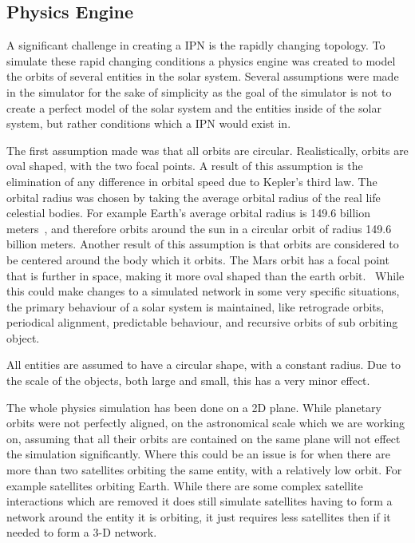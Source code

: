 \documentclass[a4paper,12pt]{article}
\begin{document}
\subsection{Physics Engine}

A significant challenge in creating a IPN is the rapidly changing topology. To
simulate these rapid changing conditions a physics engine was created to model
the orbits of several entities in the solar system. Several assumptions were
made in the simulator for the sake of simplicity as the goal of the simulator is
not to create a perfect model of the solar system and the entities inside of the
solar system, but rather conditions which a IPN would exist in.

The first assumption made was that all orbits are circular. Realistically,
orbits are oval shaped, with the two focal points. A result of this assumption
is the elimination of any difference in orbital speed due to Kepler's third law.
The orbital radius was chosen by taking the average orbital radius of the real
life celestial bodies. For example Earth's average orbital radius is 149.6
billion meters~\cite{}, and therefore orbits around the sun in a circular orbit
of radius 149.6 billion meters. Another result of this assumption is that orbits
are considered to be centered around the body which it orbits. The Mars orbit
has a focal point that is further in space, making it more oval shaped than the
earth orbit.~\cite{} While this could make changes to a simulated network in
some very specific situations, the primary behaviour of a solar system is
maintained, like retrograde orbits, periodical alignment, predictable behaviour,
and recursive orbits of sub orbiting object.

All entities are assumed to have a circular shape, with a constant radius. Due
to the scale of the objects, both large and small, this has a very minor effect.

The whole physics simulation has been done on a 2D plane. While planetary orbits
were not perfectly aligned, on the astronomical scale which we are working on,
assuming that all their orbits are contained on the same plane will not effect
the simulation significantly. Where this could be an issue is for when there are
more than two satellites orbiting the same entity, with a relatively low orbit.
For example satellites orbiting Earth. While there are some complex satellite
interactions which are removed it does still simulate satellites having to form
a network around the entity it is orbiting, it just requires less satellites
then if it needed to form a 3-D network.
\end{document}
